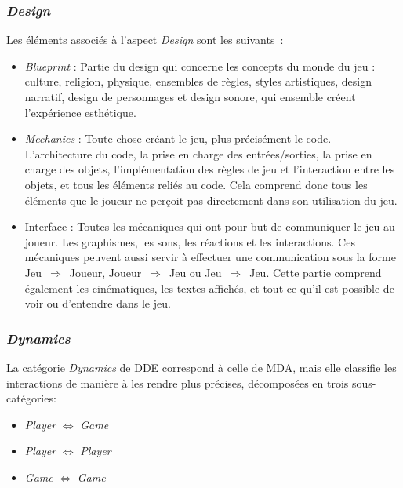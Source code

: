 
\subsubsection*{\emph{Design}}

Les \'el\'ements associ\'es \`a l'aspect \emph{Design} sont les suivants~: 
    \begin{itemize}
\item \emph{Blueprint} : Partie du design qui concerne les concepts du monde du jeu : culture, religion, physique, ensembles de règles, styles artistiques, design narratif, design de personnages et design sonore, qui ensemble créent l'expérience esthétique.
\item \emph{Mechanics} : Toute chose créant le jeu, plus précisément le code. L'architecture du code, la prise en charge des entrées/sorties, la prise en charge des objets, l'implémentation des règles de jeu et l'interaction entre les objets, et tous les éléments reliés au code. Cela comprend donc tous les éléments que le joueur ne perçoit pas directement dans son utilisation du jeu.
\item Interface : Toutes les mécaniques qui ont pour but
    de communiquer le jeu au joueur. Les graphismes, les sons, les
    réactions et les interactions. Ces mécaniques peuvent aussi servir
    à effectuer une communication sous la forme
    Jeu~$\Rightarrow$~Joueur, Joueur~$\Rightarrow$~Jeu ou
    Jeu~$\Rightarrow$~Jeu. Cette partie comprend également les
    cinématiques, les textes affichés, et tout ce qu'il est possible
    de voir ou d'entendre dans le jeu.
\end{itemize}
%
\subsubsection*{\emph{Dynamics}} 

La catégorie \emph{Dynamics} de DDE correspond à celle de MDA, mais elle classifie les interactions de manière à les rendre plus précises, d\'ecompos\'ees en trois sous-catégories: 


    \begin{itemize}
        \item \emph{Player} $\Leftrightarrow$ \emph{Game}
        \item \emph{Player} $\Leftrightarrow$ \emph{Player}
        \item \emph{Game} $\Leftrightarrow$ \emph{Game}
    \end{itemize}

